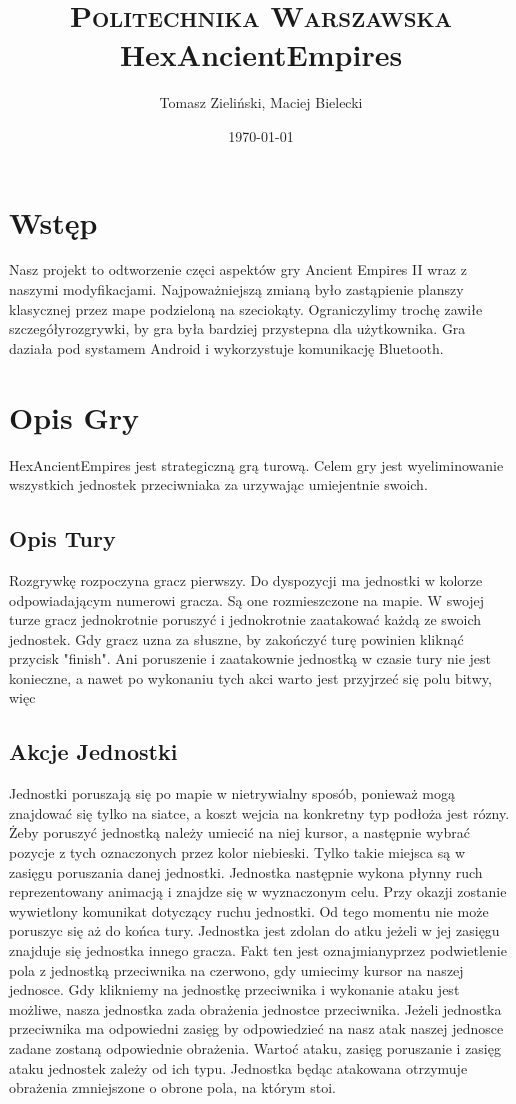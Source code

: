 \documentclass[paper=a4, fontsize=11pt]{scrartcl} %
\title{	
\normalfont \normalsize 
\textsc{Politechnika Warszawska} \\ [25pt] %
\huge HexAncientEmpires \\ %
}
\author{Tomasz Zieliński,  Maciej Bielecki}
\date{\normalsize\today}
\numberwithin{equation}{section} %
\numberwithin{figure}{section} %
\numberwithin{table}{section} %
\begin{document}
\maketitle 

\section{Wstęp}
Nasz projekt to odtworzenie częci aspektów gry Ancient Empires II wraz z naszymi modyfikacjami. Najpoważniejszą zmianą było zastąpienie planszy klasycznej przez mape podzieloną na szeciokąty. Ograniczylimy trochę zawiłe szczegółyrozgrywki, by gra była bardziej przystepna dla użytkownika. Gra daziała pod systamem Android i wykorzystuje komunikację Bluetooth. 

\section{Opis Gry}
HexAncientEmpires jest strategiczną grą turową. Celem gry jest wyeliminowanie wszystkich jednostek przeciwniaka za urzywając umiejentnie swoich. 
\subsection{Opis Tury}
Rozgrywkę rozpoczyna gracz pierwszy. Do dyspozycji ma jednostki w kolorze odpowiadającym numerowi gracza. Są one rozmieszczone na mapie.
 W swojej turze gracz jednokrotnie poruszyć i jednokrotnie zaatakować każdą ze swoich jednostek. Gdy gracz uzna za słuszne, by zakończyć turę powinien kliknąć przycisk "finish". Ani poruszenie i zaatakownie jednostką w czasie tury nie jest konieczne, a nawet po wykonaniu tych akci warto jest przyjrzeć się polu bitwy, więc 
\subsection{Akcje Jednostki}
Jednostki poruszają się po mapie w nietrywialny sposób, ponieważ mogą znajdować się tylko na siatce, a koszt wejcia na konkretny typ podłoża jest rózny. Żeby poruszyć jednostką należy umiecić na niej kursor, a następnie wybrać pozycje z tych oznaczonych przez kolor niebieski. Tylko takie miejsca są w zasięgu poruszania danej jednostki. Jednostka następnie wykona płynny ruch reprezentowany animacją i znajdze się w wyznaczonym celu. Przy okazji zostanie wywietlony komunikat dotyczący ruchu jednostki. Od tego momentu nie może poruszyc się aż do końca tury. Jednostka jest zdolan do atku jeżeli w jej zasięgu znajduje się jednostka innego gracza. Fakt ten jest oznajmianyprzez podwietlenie pola z jednostką przeciwnika na czerwono, gdy umiecimy kursor na naszej jednosce. Gdy klikniemy na jednostkę przeciwnika i wykonanie ataku jest możliwe, nasza jednostka zada obrażenia jednostce przeciwnika. Jeżeli jednostka przeciwnika ma odpowiedni zasięg by odpowiedzieć na nasz atak naszej jednosce zadane zostaną odpowiednie obrażenia. Wartoć ataku, zasięg poruszanie i zasięg ataku jednostek zależy od ich typu. Jednostka będąc atakowana otrzymuje obrażenia zmniejszone o obrone pola, na którym stoi.


\end{document}

